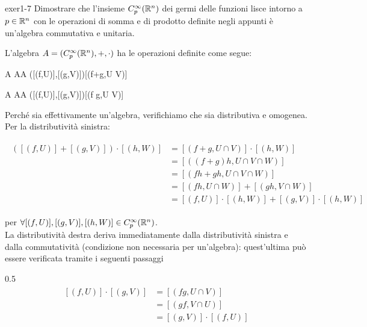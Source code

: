 {exer1-7}
{
Dimostrare che l'insieme $ C_{p}^{\infty}(\mathbb{R}^{n}) $ dei germi delle funzioni lisce intorno a $ p \in \mathbb{R}^{n} $ con le operazioni di somma e di prodotto definite negli appunti è un'algebra commutativa e unitaria.
}
{
L'algebra $ A = (C_{p}^{\infty}(\mathbb{R}^{n}),+,\cdot) $ ha le operazioni definite come segue:

\map{+}
	{A \times A}{A}
	{([(f,U)],[(g,V)])}{[(f+g,U \cap V)]}

\map{\cdot}
	{A \times A}{A}
	{([(f,U)],[(g,V)])}{[(f g,U \cap V)]}

Perché sia effettivamente un'algebra, verifichiamo che sia distributiva e omogenea. \\
Per la distributività sinistra:

\begin{align}
	\begin{split}
		([(f,U)] + [(g,V)]) \cdot [(h,W)] &= [(f+g,U \cap V)] \cdot [(h,W)] \\
		&= [((f+g) h,U \cap V \cap W)] \\
		&= [(fh + gh,U \cap V \cap W)] \\
		&= [(fh,U \cap W)] + [(gh,V \cap W)] \\
		&= [(f,U)] \cdot [(h,W)] + [(g,V)] \cdot [(h,W)]
	\end{split}
\end{align}

per $ \forall [(f,U)], [(g,V)], [(h,W)] \in C_{p}^{\infty}(\mathbb{R}^{n}) $. \\
La distributività destra deriva immediatamente dalla distributività sinistra e dalla commutatività (condizione non necessaria per un'algebra): quest'ultima può essere verificata tramite i seguenti passaggi

	{0.5}{%
			\begin{align}
				\begin{split}
					[(f,U)] \cdot [(g,V)] &= [(fg,U \cap V)] \\
					&= [(gf,V \cap U)] \\
					&= [(g,V)] \cdot [(f,U)]
				\end{split}
			\end{align}
			}

}
